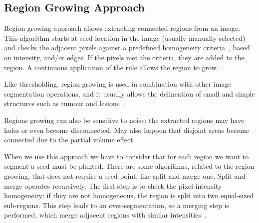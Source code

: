 \documentclass{standalone}
\begin{document}
\subsection{Region Growing Approach}

	Region growing approach allows extracting connected regions from an image. This algorithm starts at seed location in the image (usually manually selected) and checks the adjacent pixels against a predefined homogeneity criteria~\cite{INP:Withey}, based on intensity, and/or edges.   If the pixels met the criteria, they are added to the region. A continuous application of the rule allows the region to grow. 

	Like thresholding, region growing is used in combination with other image segmentation operations, and it usually allows the delineation of small and simple structures such as tumour and lesions~\cite{ART:Pham}.

	Regions growing can also be sensitive to noise: the extracted regions may have holes or even become disconnected. May also happen that disjoint areas become connected due to the partial volume effect. 

	When we use this approach we have to consider that for each region we want to segment a seed must be planted. There are some algorithms, related to the region growing, that does not require a seed point, like split and merge one. Split and merge operates recursively. The first step is to check the pixel intensity homogeneity: if they are not homogeneous, the region is split into two equal-sized sub-regions. This step leads to an over-segmentation, so a merging step is performed, which merge adjacent regions with similar intensities~\cite{INP:Withey}. 
\end{document}
